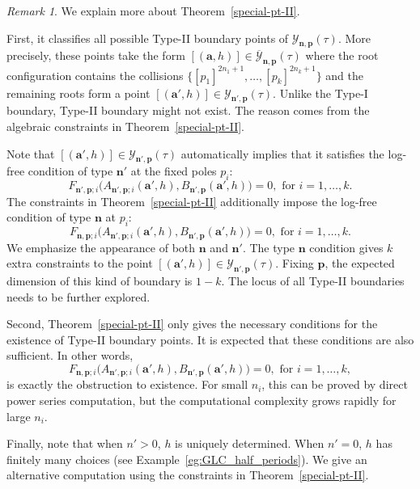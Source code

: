 \documentclass[11pt]{amsart}
\theoremstyle{remark}
\newtheorem{remark}[theorem]{Remark}
\numberwithin{equation}{section}
\begin{document}
\begin{remark}
We explain more about Theorem~\ref{special-pt-II}.

First, it classifies all possible Type-II boundary points of $\mathcal{Y}_{\mathbf{n},\mathbf{p}}(\tau)$. More precisely, these points take the form $[(\mathbf{a},h)] \in \overline{\mathcal{Y}}_{\mathbf{n},\mathbf{p}}(\tau)$ where the root configuration contains the collisions $\{[p_1]^{2n_1+1}, \dots, [p_k]^{2n_k+1}\}$ and the remaining roots form a point $[(\mathbf{a}',h)] \in \mathcal{Y}_{\mathbf{n}',\mathbf{p}}(\tau)$.  Unlike the Type-I boundary, Type-II boundary might not exist. The reason comes from the algebraic constraints in Theorem~\ref{special-pt-II}. 

Note that $[(\mathbf{a}',h)] \in \mathcal{Y}_{\mathbf{n}',\mathbf{p}}(\tau)$ automatically implies that it satisfies the log-free condition of type $\mathbf{n}'$ at the fixed poles $p_i$:
\[
    F_{\mathbf{n}',\mathbf{p};i}\Big(A_{\mathbf{n}',\mathbf{p};i}(\mathbf{a}',h),B_{\mathbf{n}',\mathbf{p}}(\mathbf{a}',h)\Big)=0, \text{ for }i=1,\dots,k.
\]
The constraints in Theorem~\ref{special-pt-II} additionally impose the log-free condition of type $\mathbf{n}$ at $p_i$: 
\[
    F_{\mathbf{n},\mathbf{p};i}\Big(A_{\mathbf{n}',\mathbf{p};i}(\mathbf{a}',h),B_{\mathbf{n}',\mathbf{p}}(\mathbf{a}',h)\Big)=0, \text{ for }i=1,\dots,k.
\]
We emphasize the appearance of both $\mathbf{n}$ and $\mathbf{n}'$. The type $\mathbf{n}$ condition gives $k$ extra constraints to the point $[(\mathbf{a}',h)] \in \mathcal{Y}_{\mathbf{n}',\mathbf{p}}(\tau)$. Fixing $\mathbf{p}$, the expected dimension of this kind of boundary is $1-k$. The locus of all Type-II boundaries needs to be further explored. 

Second, Theorem~\ref{special-pt-II} only gives the necessary conditions for the existence of Type-II boundary points. It is expected that these conditions are also sufficient. In other words, 
\[
    F_{\mathbf{n},\mathbf{p};i}\Big(A_{\mathbf{n}',\mathbf{p};i}(\mathbf{a}',h),B_{\mathbf{n}',\mathbf{p}}(\mathbf{a}',h)\Big)=0, \text{ for }i=1,\dots,k,
\]
is exactly the obstruction to existence. For small $n_i$, this can be proved by direct power series computation, but the computational complexity grows rapidly for large $n_i$.

Finally, note that when $n'>0$, $h$ is uniquely determined. When $n'=0$, $h$ has finitely many choices (see Example~\ref{eg:GLC_half_periods}). We give an alternative computation using the constraints in Theorem~\ref{special-pt-II}. 


\end{remark}
\end{document}
